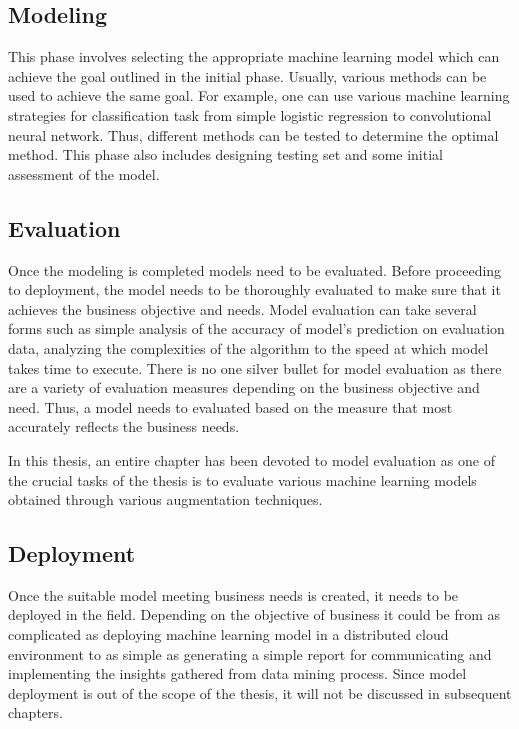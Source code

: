 \subsection{Modeling} 
This phase involves selecting the appropriate machine learning model which can achieve the goal outlined in the initial phase. Usually, various methods can be used to achieve the same goal. For example, one can use various machine learning strategies for classification task from simple logistic regression to convolutional neural network. Thus, different methods can be tested to determine the optimal method. This phase also includes designing testing set and some initial assessment of the model.

\subsection{Evaluation}
Once the modeling is completed models need to be evaluated. Before proceeding to deployment, the model needs to be thoroughly evaluated to make sure that it achieves the business objective and needs. Model evaluation can take several forms such as simple analysis of the accuracy of model's prediction on evaluation data, analyzing the complexities of the algorithm to the speed at which model takes time to execute. There is no one silver bullet for model evaluation as there are a variety of evaluation measures depending on the business objective and need. Thus, a model needs to evaluated based on the measure that most accurately reflects the business needs.

In this thesis, an entire chapter has been devoted to model evaluation as one of the crucial tasks of the thesis is to evaluate various machine learning models obtained through various augmentation techniques.   

\subsection{Deployment}
Once the suitable model meeting business needs is created, it needs to be deployed in the field. Depending on the objective of business it could be from as complicated as deploying machine learning model in a distributed cloud environment to as simple as generating a simple report for communicating and implementing the insights gathered from data mining process. Since model deployment is out of the scope of the thesis, it will not be discussed in subsequent chapters. 
 
 

